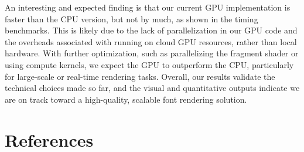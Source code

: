 \documentclass[11pt]{article}
\begin{document}
An interesting and expected finding is that our current GPU implementation is faster than the CPU version, but not by much, as shown in the timing benchmarks. This is likely due to the lack of parallelization in our GPU code and the overheads associated with running on cloud GPU resources, rather than local hardware. With further optimization, such as parallelizing the fragment shader or using compute kernels, we expect the GPU to outperform the CPU, particularly for large-scale or real-time rendering tasks. Overall, our results validate the technical choices made so far, and the visual and quantitative outputs indicate we are on track toward a high-quality, scalable font rendering solution. \\

\section{References}
\end{document}
